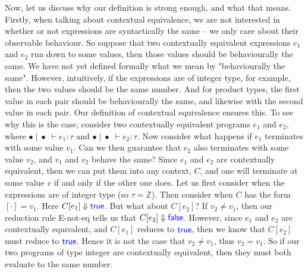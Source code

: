 \documentclass[a4paper, 11pt]{report}
\theoremstyle{definition}
\newcommand{\Keyword}[1]{{\color{blue} \mathsf{#1}}}
\newcommand{\expr}{e}
\newcommand{\val}{v}
\newcommand{\True}{\Keyword{true}}
\newcommand{\False}{\Keyword{false}}
\newcommand{\empctx}{[\cdot]}
\newcommand{\ctx}{C}
\newcommand{\Tint}{\mathbb{Z}}
\newcommand{\typ}{\tau}
\newcommand{\emptenv}{\bullet}
\newcommand{\empvenv}{\bullet}
\newcommand{\jdg}[4]{#1 \; | \; #2 \; \vdash #3 : #4}
\begin{document}
Now, let us discuss why our definition is strong enough, and what that means. Firstly, when talking about contextual equivalence, we are not interested in whether or not expressions are syntactically the same – we only care about their observable behaviour. So suppose that two contextually equivalent expressions $\expr_1$ and $\expr_2$ run down to some values, then those values should be behaviourally the same. We have not yet defined formally what we mean by "behaviourally the same". However, intuitively, if the expressions are of integer type, for example, then the two values should be the same number. And for product types, the first value in each pair should be behaviourally the same, and likewise with the second value in each pair. Our definition of contextual equivalence ensures this. To see why this is the case, consider two contextually equivalent programs $\expr_1$ and $\expr_2$, where $\jdg{\emptenv}{\empvenv}{\expr_1}{\typ}$ and $\jdg{\emptenv}{\empvenv}{\expr_2}{\typ}$.
Now consider what happens if $\expr_1$ terminates with some value $\val_1$. Can we then guarantee that $\expr_2$ also terminates with some value $\val_2$, and $\val_1$ and $\val_2$ behave the same? Since $\expr_1$ and $\expr_2$ are contextually equivalent, then we can put them into any context, $\ctx$, and one will terminate at some value $\val$ if and only if the other one does.
Let us first consider when the expressions are of integer type (so $\typ = \Tint$). Then consider when $\ctx$ has the form $\empctx = \val_1$. Here $\ctx[\expr_1] \Downarrow \True$. But what about $\ctx[\expr_2]$? If $\val_2 \neq \val_1$, then our reduction rule E-not-eq tells us that $\ctx[\expr_2] \Downarrow \False$. However, since $\expr_1$ and $\expr_2$ are contextually equivalent, and $\ctx[\expr_1]$ reduces to $\True$, then we know that $\ctx[\expr_2]$ must reduce to $\True$. Hence it is not the case that $\val_2 \neq \val_1$, thus $\val_2 = \val_1$. So if our two programs of type integer are contextually equivalent, then they must both evaluate to the same number.
\end{document}
